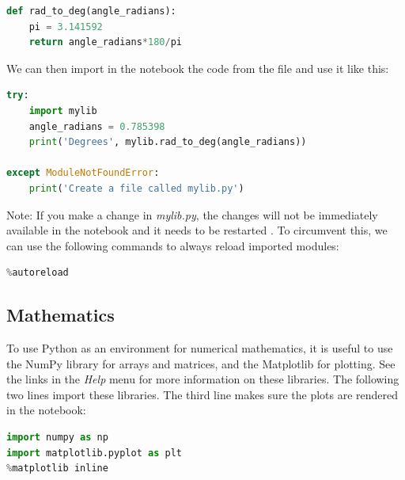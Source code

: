 \documentclass[a4paper , 12pt]{book}
\begin{document}
\begin{center}
\begin{lstlisting}[language=Python, frame=single]
def rad_to_deg(angle_radians):
    pi = 3.141592
    return angle_radians*180/pi
\end{lstlisting}
\end{center}

We can then import in the notebook the code from the file and use it like this:

\begin{center}
\begin{lstlisting}[language=Python, frame=single]
try:
    import mylib
    angle_radians = 0.785398
    print('Degrees', mylib.rad_to_deg(angle_radians))
    
except ModuleNotFoundError:
    print('Create a file called mylib.py')
\end{lstlisting}
\end{center}

Note: If you make a change in \textit{mylib.py}, the changes will not be immediately available in the notebook and it needs to be restarted . To circumvent this, we can use the following commands to always reload imported modules:

\begin{center}
\begin{lstlisting}[language=Python, frame=single]
%load_ext autoreload
%autoreload
\end{lstlisting}   
\end{center}

\subsection{Mathematics}

To use Python as an environment for numerical mathematics, it is useful to use the NumPy library for arrays and matrices, and the Matplotlib for plotting. See the links in the \textit{Help} menu for more information on these libraries. The following two lines import these libraries. The third line makes sure the plots are rendered in the notebook:

\begin{center}
\begin{lstlisting}[language=Python, frame=single]
import numpy as np
import matplotlib.pyplot as plt
%matplotlib inline
\end{lstlisting}
\end{center}
\end{document}
